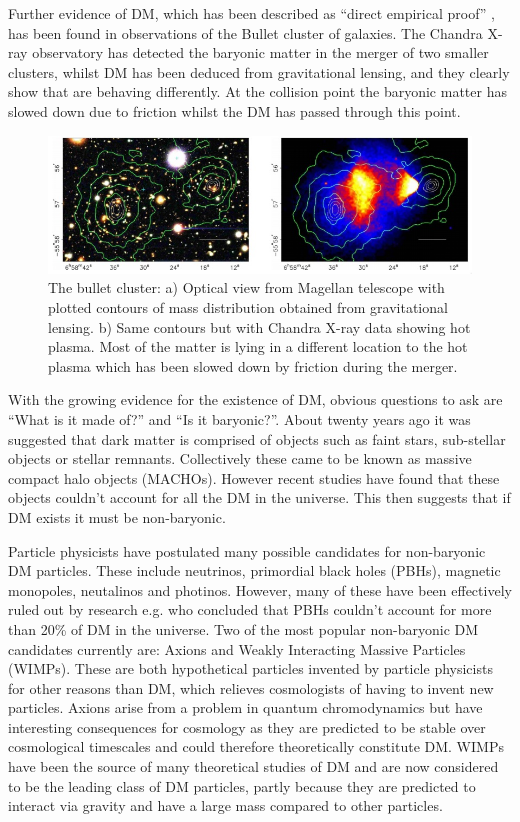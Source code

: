 \documentclass[a4paper,12pt]{article}
\begin{document}
Further evidence of DM, which has been described as ``direct empirical proof'' \citep{clowe}, has been found in observations of the Bullet cluster of galaxies. The Chandra X-ray observatory 
has detected the baryonic matter in the merger of two smaller clusters, whilst DM has been deduced from gravitational lensing, and they clearly show that are behaving differently.
At the collision point the baryonic matter has slowed down due to friction whilst the DM has passed through this point.
\begin{figure}[H]
\centering
\includegraphics[width=.9\textwidth]{./bullet.jpg}
\caption{The bullet cluster: a) Optical view from Magellan telescope with plotted contours of mass distribution obtained from gravitational lensing.
b) Same contours but with Chandra X-ray data showing hot plasma. Most of the matter is lying in a different location to the hot plasma which has been slowed down by friction 
during the merger. \citep{clowe}}
\label{fig:2}
\end{figure}

With the growing evidence for the existence of DM, obvious questions to ask are ``What is it made of?'' and ``Is it baryonic?''. About twenty years ago it was suggested that dark matter is
comprised of objects such as faint stars, sub-stellar objects or stellar remnants. Collectively these came to be known as massive compact halo objects (MACHOs). However recent studies 
\citep{freese} have found that these objects couldn't account for all the DM in the universe. This then suggests that if DM exists it must be non-baryonic.

Particle physicists have postulated many possible candidates for non-baryonic DM particles. These include neutrinos, primordial black holes (PBHs), magnetic monopoles, neutalinos and photinos.
However, many of these have been effectively ruled out by research e.g. \cite{gaggero} who concluded that PBHs couldn't account for more than 20\% of DM in the universe.
Two of the most popular non-baryonic DM candidates currently are: Axions and Weakly Interacting Massive Particles (WIMPs). These are both hypothetical particles invented by particle 
physicists for other reasons than DM, which relieves cosmologists of having to invent new particles. Axions arise from a problem in quantum chromodynamics but have interesting 
consequences for cosmology as they are predicted to be stable over cosmological timescales \citep{bertone1} and could therefore theoretically constitute DM. WIMPs have been the source
of many theoretical studies of DM and are now considered to be the leading class of DM particles, partly because they are predicted to interact via gravity and have a large mass
compared to other particles.
\end{document}
